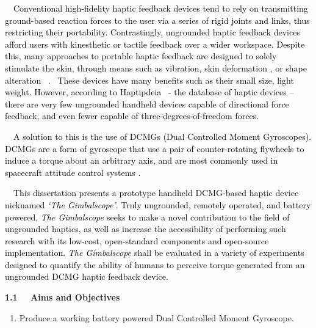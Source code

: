 \documentclass[a4paper]{article}
\newcommand\liststyleWWNumxxiii{%
\renewcommand\theenumi{\arabic{enumi}}
\renewcommand\theenumii{\arabic{enumi}.\arabic{enumii}}
\renewcommand\theenumiii{\arabic{enumi}.\arabic{enumii}.\arabic{enumiii}}
\renewcommand\theenumiv{\arabic{enumi}.\arabic{enumii}.\arabic{enumiii}.\arabic{enumiv}}
\renewcommand\labelenumi{\theenumi}
\renewcommand\labelenumii{\theenumii}
\renewcommand\labelenumiii{\theenumiii}
\renewcommand\labelenumiv{\theenumiv}
}
\begin{document}
\textcolor{black}{\ \ Conventional high-fidelity haptic feedback devices tend to rely on transmitting ground-based
reaction forces to the user via a series of rigid joints and links, thus restricting their portability. Contrastingly,
ungrounded haptic feedback devices afford users with kinesthetic or tactile feedback over a wider workspace. Despite
this, many approaches to portable haptic feedback are designed to solely stimulate the skin, through means such as
vibration}\cite{CITATIONTOr07l2057}\textcolor{black}{, skin deformation}\cite{CITATIONTSm20l2057}\textcolor{black}{ ,
or shape alteration
}\cite{CITATIONAJS17l2057}\cite{CITATIONCSw03l2057}\textcolor{black}{\ }\cite{CITATIONAZe19l2057}\textcolor{black}{.
\ These devices have many benefits such as their small size, light weight. However, according to Haptipdeia
}\cite{CITATIONHas19l2057}\textcolor{black}{\ {}- the database of haptic devices -- there are very few ungrounded
handheld devices capable of directional force feedback, and even fewer capable of three-degrees-of-freedom forces.}

\textcolor{black}{\ \ A solution to this is the use of DCMGs (Dual Controlled Moment Gyroscopes). DCMGs are a form of
gyroscope that use a pair of counter-rotating flywheels to induce a torque about an arbitrary axis, and are most
commonly used in spacecraft attitude control systems }\cite{CITATIONPCu14l2057}\textcolor{black}{.}

\textcolor{black}{\ \ This dissertation presents a prototype handheld DCMG-based haptic device nicknamed
}\textit{\textcolor{black}{{}`The Gimbalscope'}}\textcolor{black}{. Truly ungrounded, remotely operated, and battery
powered, }\textit{\textcolor{black}{The Gimbalscope }}\textcolor{black}{seeks to make a novel contribution to the field
of ungrounded haptics, as well as increase the accessibility of performing such research with its low-cost,
open-standard components and open-source implementation. }\textit{\textcolor{black}{The Gimbalscope
}}\textcolor{black}{shall be evaluated}\textit{\textcolor{black}{ }}\textcolor{black}{in a variety of experiments
designed to quantify the ability of humans to perceive torque generated from an ungrounded DCMG haptic feedback
device.}


\bigskip


\bigskip

\textbf{1.1 \ \ Aims and Objectives}


\bigskip

\liststyleWWNumxxiii
\begin{enumerate}
\item Produce a working battery powered Dual Controlled Moment Gyroscope.
\end{enumerate}
\end{document}
